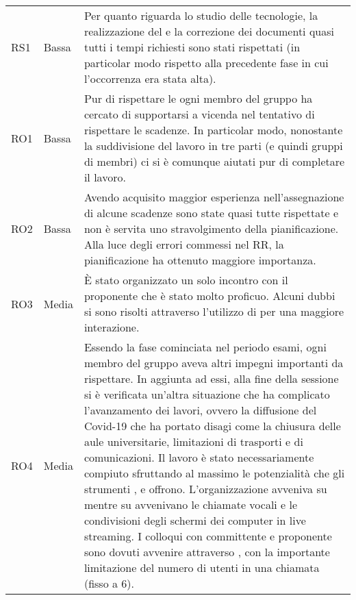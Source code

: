 {\begin{longtable}{C{2cm} C{3cm} C{10cm}}
RS1 &
Bassa &
Per quanto riguarda lo studio delle tecnologie, la realizzazione del  e la correzione dei documenti quasi tutti i tempi richiesti sono stati rispettati (in particolar modo rispetto alla precedente fase in cui l'occorrenza era stata alta). \\

RO1 &
Bassa &
Pur di rispettare le  ogni membro del gruppo ha cercato di supportarsi a vicenda nel tentativo di rispettare le scadenze. In particolar modo, nonostante la suddivisione del lavoro in tre parti (e quindi gruppi di membri) ci si è comunque aiutati pur di completare il lavoro. \\

RO2 &
Bassa &
Avendo acquisito maggior esperienza nell'assegnazione di alcune scadenze sono state quasi tutte rispettate e non è servita uno stravolgimento della pianificazione. Alla luce degli errori commessi nel RR, la pianificazione ha ottenuto maggiore importanza. \\

RO3 &
Media &
È stato organizzato un solo incontro con il proponente che è stato molto proficuo. Alcuni dubbi si sono risolti attraverso l'utilizzo di  per una maggiore interazione. \\

RO4 &
Media &
Essendo la fase cominciata nel periodo esami, ogni membro del gruppo aveva altri impegni importanti da rispettare.
In aggiunta ad essi, alla fine della sessione si è verificata un'altra situazione che ha complicato l'avanzamento dei lavori, ovvero la diffusione del Covid-19 che ha portato disagi come la chiusura delle aule universitarie, limitazioni di trasporti e di comunicazioni.
Il lavoro è stato necessariamente compiuto sfruttando al massimo le potenzialità che gli strumenti ,  e  offrono.
L'organizzazione avveniva su  mentre su  avvenivano le chiamate vocali e le condivisioni degli schermi dei computer in live streaming.
I colloqui con committente e proponente sono dovuti avvenire attraverso , con la importante limitazione del numero di utenti in una chiamata (fisso a 6). \\

\end{longtable}	
}